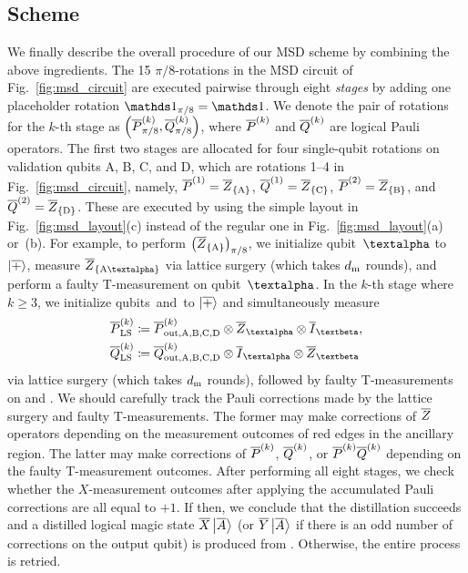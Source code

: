 \documentclass[
 prx,
 reprint,
 superscriptaddress,
 longbibliography,
 dvipsnames
]{revtex4-2}
\begin{document}
\subsection{Scheme \label{subsec:scheme}}

We finally describe the overall procedure of our MSD scheme by combining the above ingredients.
The 15 $\pi/8$-rotations in the MSD circuit of Fig.~\ref{fig:msd_circuit} are executed pairwise through eight \emph{stages} by adding one placeholder rotation $\rot{\identity}{\pi/8} = \identity$.
We denote the pair of rotations for the $k$-th stage as $\qty(\overline{P}^{(k)}_{\pi/8}, \overline{Q}^{(k)}_{\pi/8})$, where $\overline{P}^{(k)}$ and $\overline{Q}^{(k)}$ are logical Pauli operators.
The first two stages are allocated for four single-qubit rotations on validation qubits A, B, C, and D, which are rotations 1--4 in Fig.~\ref{fig:msd_circuit}, namely, $\overline{P}^{(1)} = \overline{Z}_\qty{\text{A}}$, $\overline{Q}^{(1)} = \overline{Z}_\qty{\text{C}}$, $\overline{P}^{(2)} = \overline{Z}_\qty{\text{B}}$, and $\overline{Q}^{(2)} = \overline{Z}_\qty{\text{D}}$.
These are executed by using the simple layout in Fig.~\ref{fig:msd_layout}(c) instead of the regular one in Fig.~\ref{fig:msd_layout}(a) or~(b).
For example, to perform $\qty(\overline{Z}_\qty{\text{A}})_{\pi/8}$, we initialize qubit~$\mralpha$ to $\ket{\overline{+}}$, measure $\lgztp{A\mralpha}$ via lattice surgery (which takes $d_{\mathrm{m}}$ rounds), and perform a faulty T-measurement on qubit~$\mralpha$.
In the $k$-th stage where $k \geq 3$, we initialize qubits~\talpha and~\tbeta to $\ket{\overline{+}}$ and simultaneously measure 
\begin{align}
\begin{split}
    \PstageLS{k} &\coloneqq \Pstage{k}_{\mr{out,A,B,C,D}} \otimes \lgz_\mralpha \otimes \lgi_\mrbeta, \\ 
    \QstageLS{k} &\coloneqq \Qstage{k}_{\mr{out,A,B,C,D}} \otimes \lgi_\mralpha \otimes \lgz_\mrbeta
\end{split}
    \label{eq:dist_operators_to_measure}
\end{align}
via lattice surgery (which takes $d_{\mathrm{m}}$ rounds), followed by faulty T-measurements on \patchalpha and \patchbeta.
We should carefully track the Pauli corrections made by the lattice surgery and faulty T-measurements.
The former may make corrections of $\overline{Z}$ operators depending on the measurement outcomes of red edges in the ancillary region.
The latter may make corrections of $\overline{P}^{(k)}$, $\overline{Q}^{(k)}$, or $\overline{P}^{(k)}\overline{Q}^{(k)}$ depending on the faulty T-measurement outcomes.
After performing all eight stages, we check whether the $X$-measurement outcomes after applying the accumulated Pauli corrections are all equal to $+1$.
If then, we conclude that the distillation succeeds and a distilled logical magic state $\overline{X}\ket{\overline{A}}$ (or $\overline{Y}\ket{\overline{A}}$ if there is an odd number of corrections on the output qubit) is produced from \patchout.
Otherwise, the entire process is retried.
\end{document}
